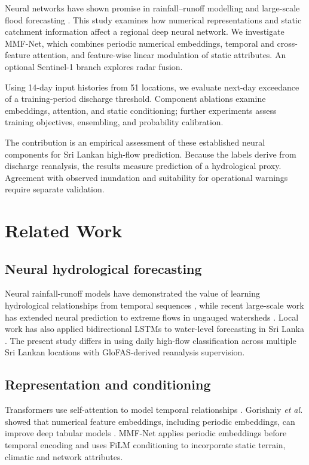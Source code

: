 \documentclass[conference]{IEEEtran}
\newcommand{\model}{MMF-Net}
\begin{document}
Neural networks have shown promise in rainfall--runoff modelling
and large-scale flood forecasting
\cite{kratzert2018,nearing2024}. This study examines how numerical
representations and static catchment information affect a regional
deep neural network. We investigate \model{}, which combines
periodic numerical embeddings, temporal and cross-feature
attention, and feature-wise linear modulation of static attributes.
An optional Sentinel-1 branch explores radar fusion.

Using 14-day input histories from 51 locations, we evaluate
next-day exceedance of a training-period discharge threshold.
Component ablations examine embeddings, attention, and static
conditioning; further experiments assess training objectives,
ensembling, and probability calibration.

The contribution is an empirical assessment of these established
neural components for Sri Lankan high-flow prediction. Because
the labels derive from discharge reanalysis, the results measure
prediction of a hydrological proxy. Agreement with observed
inundation and suitability for operational warnings require
separate validation.

\section{Related Work}

\subsection{Neural hydrological forecasting}
Neural rainfall-runoff models have demonstrated the value of learning
hydrological relationships from temporal sequences \cite{kratzert2018}, while
recent large-scale work has extended neural prediction to extreme flows in
ungauged watersheds \cite{nearing2024}. Local work has also applied
bidirectional LSTMs to water-level forecasting in Sri Lanka
\cite{saubhagya2025}. The present study differs in using daily high-flow
classification across multiple Sri Lankan locations with GloFAS-derived
reanalysis supervision.

\subsection{Representation and conditioning}
Transformers use self-attention to model temporal relationships
\cite{vaswani2017}. Gorishniy \emph{et al.} showed that numerical feature
embeddings, including periodic embeddings, can improve deep tabular models
\cite{gorishniy2022}. \model{} applies periodic embeddings before temporal
encoding and uses FiLM conditioning \cite{perez2018} to incorporate static
terrain, climatic and network attributes.
\end{document}
